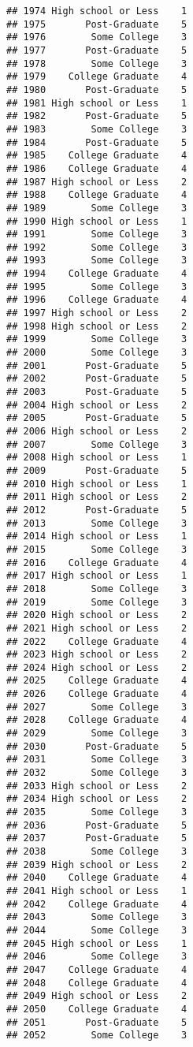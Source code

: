 \documentclass[
]{article}
\begin{document}
\begin{verbatim}
## 1974 High school or Less    1
## 1975       Post-Graduate    5
## 1976        Some College    3
## 1977       Post-Graduate    5
## 1978        Some College    3
## 1979    College Graduate    4
## 1980       Post-Graduate    5
## 1981 High school or Less    1
## 1982       Post-Graduate    5
## 1983        Some College    3
## 1984       Post-Graduate    5
## 1985    College Graduate    4
## 1986    College Graduate    4
## 1987 High school or Less    2
## 1988    College Graduate    4
## 1989        Some College    3
## 1990 High school or Less    1
## 1991        Some College    3
## 1992        Some College    3
## 1993        Some College    3
## 1994    College Graduate    4
## 1995        Some College    3
## 1996    College Graduate    4
## 1997 High school or Less    2
## 1998 High school or Less    2
## 1999        Some College    3
## 2000        Some College    3
## 2001       Post-Graduate    5
## 2002       Post-Graduate    5
## 2003       Post-Graduate    5
## 2004 High school or Less    2
## 2005       Post-Graduate    5
## 2006 High school or Less    2
## 2007        Some College    3
## 2008 High school or Less    1
## 2009       Post-Graduate    5
## 2010 High school or Less    1
## 2011 High school or Less    2
## 2012       Post-Graduate    5
## 2013        Some College    3
## 2014 High school or Less    1
## 2015        Some College    3
## 2016    College Graduate    4
## 2017 High school or Less    1
## 2018        Some College    3
## 2019        Some College    3
## 2020 High school or Less    2
## 2021 High school or Less    2
## 2022    College Graduate    4
## 2023 High school or Less    2
## 2024 High school or Less    2
## 2025    College Graduate    4
## 2026    College Graduate    4
## 2027        Some College    3
## 2028    College Graduate    4
## 2029        Some College    3
## 2030       Post-Graduate    5
## 2031        Some College    3
## 2032        Some College    3
## 2033 High school or Less    2
## 2034 High school or Less    2
## 2035        Some College    3
## 2036       Post-Graduate    5
## 2037       Post-Graduate    5
## 2038        Some College    3
## 2039 High school or Less    2
## 2040    College Graduate    4
## 2041 High school or Less    1
## 2042    College Graduate    4
## 2043        Some College    3
## 2044        Some College    3
## 2045 High school or Less    1
## 2046        Some College    3
## 2047    College Graduate    4
## 2048    College Graduate    4
## 2049 High school or Less    2
## 2050    College Graduate    4
## 2051       Post-Graduate    5
## 2052        Some College    3

\end{verbatim}
\end{document}
